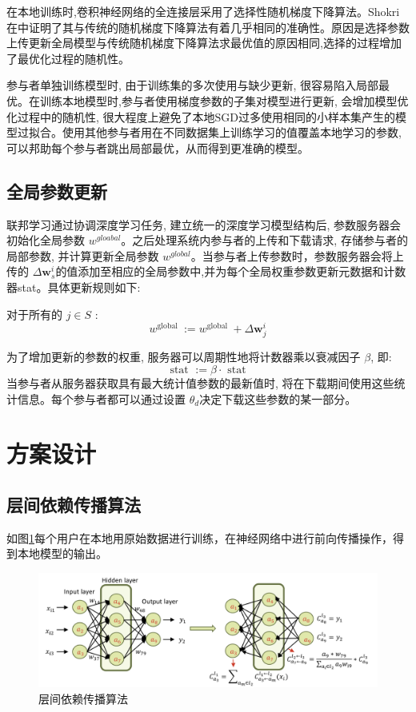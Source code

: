 在本地训练时,卷积神经网络的全连接层采用了选择性随机梯度下降算法。Shokri在\cite{ref35}中证明了其与传统的随机梯度下降算法有着几乎相同的准确性。原因是选择参数上传更新全局模型与传统随机梯度下降算法求最优值的原因相同,选择的过程增加了最优化过程的随机性。

参与者单独训练模型时, 由于训练集的多次使用与缺少更新, 很容易陷入局部最优。在训练本地模型时,参与者使用梯度参数的子集对模型进行更新, 会增加模型优化过程中的随机性, 很大程度上避免了本地$\mathrm{SGD}$过多使用相同的小样本集产生的模型过拟合。使用其他参与者用在不同数据集上训练学习的值覆盖本地学习的参数,可以邦助每个参与者跳出局部最优，从而得到更准确的模型。

\subsection{全局参数更新}
联邦学习通过协调深度学习任务, 建立统一的深度学习模型结构后, 参数服务器会初始化全局参数 $w^{gloabal}$。之后处理系统内参与者的上传和下载请求, 存储参与者的局部参数, 并计算更新全局参数 $w^{g l o b a l}$。当参与者上传参数时，参数服务器会将上传的 $\Delta\boldsymbol{w}_{s}^{i}$的值添加至相应的全局参数中,并为每个全局权重参数更新元数据和计数器stat。具体更新规则如下:

对于所有的 $j \in S$ :
\begin{equation}\label{eq:全局参数更新1}
w^{\text {global }}:=w^{\text {global }}+\Delta \boldsymbol{w}_{j}^{i}
\end{equation}


为了增加更新的参数的权重, 服务器可以周期性地将计数器乘以衰减因子 $\beta$, 即:
\begin{equation}\label{eq:全局参数更新2}
\text { stat }:=\beta \cdot \text { stat }
\end{equation}
当参与者从服务器获取具有最大统计值参数的最新值时, 将在下载期间使用这些统计信息。每个参与者都可以通过设置 $\theta_{d}$决定下载这些参数的某一部分。

\section{方案设计}{}
\subsection{层间依赖传播算法}
如图\ref{fig:层间依赖传播算法}每个用户在本地用原始数据进行训练，在神经网络中进行前向传播操作，得到本地模型的输出。

\begin{figure}[!hbt]
\centering
	\includegraphics[scale=0.7]{fig2/C3/前向传播算法}%
	\caption{层间依赖传播算法}
	\label{fig:层间依赖传播算法}	
\end{figure}

